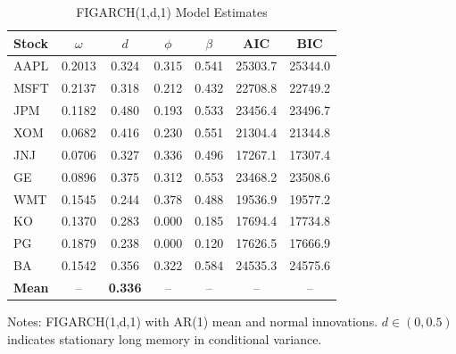 
\begin{table}[htbp]
\centering
\caption{FIGARCH(1,d,1) Model Estimates}
\label{tab:figarch_estimates}
\small
\begin{tabular}{lcccccc}
\toprule
Stock & $\omega$ & $d$ & $\phi$ & $\beta$ & AIC & BIC \\
\midrule
AAPL & 0.2013 & 0.324 & 0.315 & 0.541 & 25303.7 & 25344.0 \\
MSFT & 0.2137 & 0.318 & 0.212 & 0.432 & 22708.8 & 22749.2 \\
JPM & 0.1182 & 0.480 & 0.193 & 0.533 & 23456.4 & 23496.7 \\
XOM & 0.0682 & 0.416 & 0.230 & 0.551 & 21304.4 & 21344.8 \\
JNJ & 0.0706 & 0.327 & 0.336 & 0.496 & 17267.1 & 17307.4 \\
GE & 0.0896 & 0.375 & 0.312 & 0.553 & 23468.2 & 23508.6 \\
WMT & 0.1545 & 0.244 & 0.378 & 0.488 & 19536.9 & 19577.2 \\
KO & 0.1370 & 0.283 & 0.000 & 0.185 & 17694.4 & 17734.8 \\
PG & 0.1879 & 0.238 & 0.000 & 0.120 & 17626.5 & 17666.9 \\
BA & 0.1542 & 0.356 & 0.322 & 0.584 & 24535.3 & 24575.6 \\
\midrule
\textbf{Mean} & -- & \textbf{0.336} & -- & -- & -- & -- \\
\bottomrule
\end{tabular}
\begin{tablenotes}\small
\item Notes: FIGARCH(1,d,1) with AR(1) mean and normal innovations. $d \in (0, 0.5)$ indicates stationary long memory in conditional variance.
\end{tablenotes}
\end{table}
